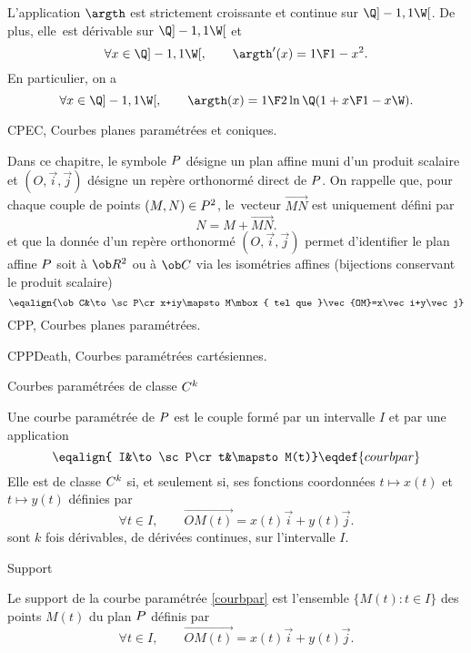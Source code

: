 \Propriete []  L'application $\argth$ est strictement croissante et continue sur $\Q]-1,1\W[$. 
De plus, elle~est dérivable sur $\Q]-1,1\W[$ et 
$$
\forall x\in\Q]-1,1\W[ ,\qquad  \argth'(x)={1\F1-x^2 }. 
$$
En particulier, on a 
$$
\forall x\in\Q]-1,1\W[,\qquad\argth(x)={1\F2}\ln\Q({1+x\F1-x}\W). 
$$
























\Chapter CPEC, Courbes planes paramétrées et coniques.
\bigskip

\noindent
Dans ce chapitre, le symbole $\sc P$ désigne un plan affine muni d'un produit scalaire 
et $(O,\vec i,\vec j)$ désigne un repère orthonormé direct de $\sc P$. 
\bigskip
\noindent
On rappelle que, pour chaque couple de points $(M,N)\in\sc P^2$, le~vecteur $\vec{MN}$ est uniquement défini par 
$$
N=M+\vec{MN}.
$$
et que la donnée d'un repère orthonormé $(O,\vec i,\vec j)$ permet d'identifier le plan affine $\sc P$ soit à $\ob R^2$ ou à $\ob C$ via les isométries affines (bijections conservant le produit scalaire)
$$
\eqalign{\ob C&\to\sc P\cr x+iy\mapsto  M\mbox{ tel que }\vec{OM}=x\vec i+y\vec j}
$$
\bigskip
\Section CPP, Courbes planes paramétrées.

\Subsection CPPDeath, Courbes paramétrées cartésiennes.

\Concept [] Courbes paramétrées de classe $\sc C^k$

\noindent
Une courbe paramétrée de $\sc P$ est le couple formé par un intervalle $I$ et par une application 
$$
\eqalign{ I&\to\sc P\cr t&\mapsto  M(t)}\eqdef{courbpar}
$$ 
Elle est de classe $\sc C^k$ si, et seulement si, ses fonctions coordonnées $t\mapsto x(t)$ et $t\mapsto y(t)$ définies par 
$$
\forall t\in I, \qquad \vec {OM(t)}=x(t)\vec i+y(t)\vec j. 
$$
sont $k$ fois dérivables, de dérivées continues, sur l'intervalle $I$. 
\bigskip

\Concept [] Support

\noindent
Le support de la courbe paramétrée \eqref{courbpar} est l'ensemble $\{M(t):t\in I\}$ des points $M(t)$ du plan $\sc P$ définis par  
$$
\forall t\in I, \qquad \vec {OM(t)}=x(t)\vec i+y(t)\vec j. 
$$

